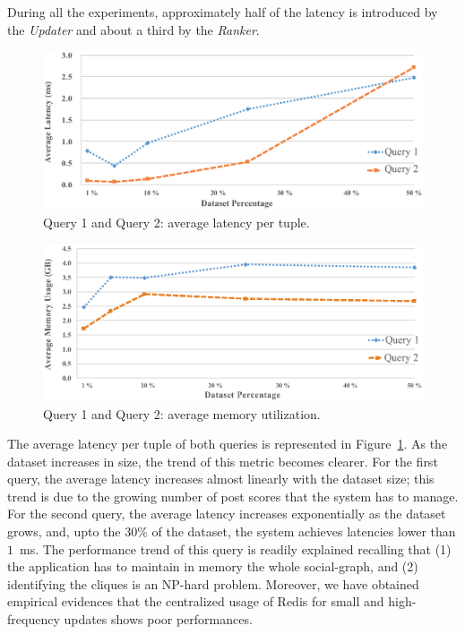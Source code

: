 During all the experiments, approximately half of the latency is introduced by the \textit{Updater} and about a third by the \textit{Ranker}.

\begin{figure}
	\centering
	\includegraphics[width=\columnwidth]{fig/latency_prop_final2}
	\caption{Query 1 and Query 2: average latency per tuple.}
	\label{fig:latency}
\end{figure}

\begin{figure}
	\centering
	\includegraphics[width=\columnwidth]{fig/memory_prop_final}
	\caption{Query 1 and Query 2: average memory utilization.}
	\label{fig:memory}
\end{figure}

The average latency per tuple of both queries is represented in Figure~\ref{fig:latency}.
%
As the dataset increases in size, the trend of this metric becomes clearer.
%
For the first query, the average latency increases almost linearly with the dataset size; this trend is due to the growing number of post scores that the system has to manage. 
%
For the second query, the average latency increases exponentially as the dataset grows, and, upto the $ 30 \% $ of the dataset, the system achieves latencies lower than $ 1 $~ms. 
The performance trend of this query is readily explained recalling that (1) the application has to maintain in memory the whole social-graph, and (2) identifying the cliques is an NP-hard problem. 
Moreover, we have obtained empirical evidences that the centralized usage of Redis for small and high-frequency updates shows poor performances. 

